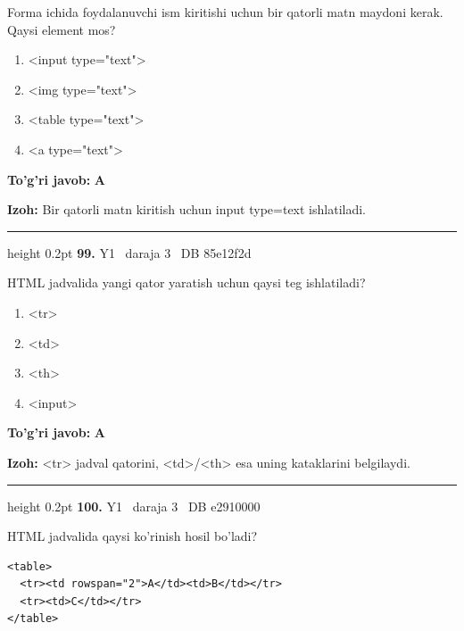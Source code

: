 \documentclass[10pt,a4paper,oneside]{article}
\begin{document}
Forma ichida foydalanuvchi ism kiritishi uchun bir qatorli matn maydoni kerak. Qaysi element mos?
\begin{enumerate}[label=\Alph*),leftmargin=9mm]
\item \textless{}input type="text"\textgreater{}
\item \textless{}img type="text"\textgreater{}
\item \textless{}table type="text"\textgreater{}
\item \textless{}a type="text"\textgreater{}
\end{enumerate}
\begin{tcolorbox}[enhanced,breakable,colback=teal!4,colframe=teal!45!black,boxrule=0.45pt,arc=1.2mm,left=2.8mm,right=2.8mm,top=2mm,bottom=2mm,before skip=2mm,after skip=2mm]
\textbf{\color{teal}To'g'ri javob:} \textbf{A}
\par\smallskip
\textbf{Izoh:} Bir qatorli matn kiritish uchun input type=text ishlatiladi.
\end{tcolorbox}
\vspace{2mm}\hrule height 0.2pt \vspace{4mm}
\hypertarget{q99}{\textbf{\color{ink}99.}}  {\color{muted}\scriptsize Y1 \textbullet\ daraja 3 \textbullet\ DB 85e12f2d}
\par
HTML jadvalida yangi qator yaratish uchun qaysi teg ishlatiladi?
\begin{enumerate}[label=\Alph*),leftmargin=9mm]
\item \textless{}tr\textgreater{}
\item \textless{}td\textgreater{}
\item \textless{}th\textgreater{}
\item \textless{}input\textgreater{}
\end{enumerate}
\begin{tcolorbox}[enhanced,breakable,colback=teal!4,colframe=teal!45!black,boxrule=0.45pt,arc=1.2mm,left=2.8mm,right=2.8mm,top=2mm,bottom=2mm,before skip=2mm,after skip=2mm]
\textbf{\color{teal}To'g'ri javob:} \textbf{A}
\par\smallskip
\textbf{Izoh:} \textless{}tr\textgreater{} jadval qatorini, \textless{}td\textgreater{}/\textless{}th\textgreater{} esa uning kataklarini belgilaydi.
\end{tcolorbox}
\vspace{2mm}\hrule height 0.2pt \vspace{4mm}
\hypertarget{q100}{\textbf{\color{ink}100.}}  {\color{muted}\scriptsize Y1 \textbullet\ daraja 3 \textbullet\ DB e2910000}
\par
HTML jadvalida qaysi ko'rinish hosil bo'ladi?\par
\begin{lstlisting}
<table>
  <tr><td rowspan="2">A</td><td>B</td></tr>
  <tr><td>C</td></tr>
</table>
\end{lstlisting}
\end{document}
